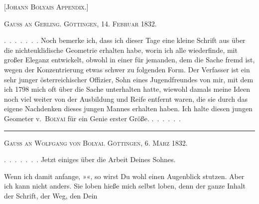 \clearpage
{}%
\begin{center}\Large\textsc{[Johann Bolyais Appendix.]}\end{center}
\bigskip
\begin{center}\textsc{Gauss an Gerling. Göttingen, 14. Februar 1832.}\end{center}
\mbox{.\ .\ .\ .\ .\ .\ .} Noch bemerke ich, dass ich dieser Tage eine kleine Schrift aus  über die nichteuklidische Geometrie erhalten habe, worin ich alle  wiederfinde, mit großer Eleganz entwickelt, obwohl in einer für jemanden, dem die Sache fremd ist, wegen der Konzentrierung etwas schwer zu folgenden Form. Der Verfasser ist ein sehr junger österreichischer Offizier, Sohn eines Jugendfreundes von mir, mit dem ich 1798 mich oft über die Sache unterhalten hatte, wiewohl damals meine Ideen noch viel weiter von der Ausbildung und Reife entfernt waren, die sie durch das eigene Nachdenken dieses jungen Mannes erhalten haben. Ich halte diesen jungen Geometer v.~\textsc{Bolyai} für ein Genie erster Größe. \mbox{.\ .\ .\ .\ .\ .}

\bigskip
\begin{center}\rule{.25\textwidth}{.3pt}\end{center}
\bigskip
\begin{center}\textsc{Gauss an Wolfgang von Bolyai. Göttingen, 6. März 1832.}\end{center}
\mbox{.\ .\ .\ .\ .\ .\ .} Jetzt einiges über die Arbeit Deines Sohnes.

Wenn ich damit anfange, »«, so wirst Du wohl einen Augenblick stutzen. Aber ich kann nicht anders. Sie loben hieße mich selbst loben, denn der ganze Inhalt der Schrift, der Weg, den Dein
